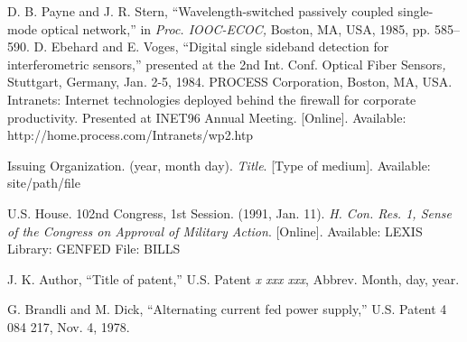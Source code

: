 \documentclass{IEEEtaes}
\begin{document}
\vspace*{-12pt}
\begin{thebibliography}{[31d]}
\setcounter{enumiv}{13}
D. B. Payne and J. R. Stern, ``Wavelength-switched passively coupled single-mode optical network,'' in \emph{Proc. IOOC-ECOC,} Boston, MA, USA, 1985, pp. 585--590.
D. Ebehard and E. Voges, ``Digital single sideband detection for interferometric sensors,'' presented at the 2nd Int. Conf. Optical Fiber Sensors\emph{,} Stuttgart, Germany, Jan. 2-5, 1984.
PROCESS Corporation, Boston, MA, USA. Intranets: Internet technologies deployed behind the firewall for corporate productivity. Presented at INET96 Annual Meeting. {[}Online{]}. Available: http://home.process.com/Intranets/wp2.htp
\end{thebibliography}

\vspace*{-12pt}
\begin{thebibliography}{[31d]}
\item[] Issuing Organization. (year, month day). \emph{Title}. {[}Type of medium{]}. Available: site/path/file
\end{thebibliography}

\vspace*{-12pt}
\begin{thebibliography}{[31d]}
\setcounter{enumiv}{16}
U.S. House. 102nd Congress, 1st Session. (1991, Jan. 11). \emph{H. Con. Res. 1, Sense of the Congress on Approval of Military Action}. {[}Online{]}. Available: LEXIS Library: GENFED File: BILLS
\end{thebibliography}

\vspace*{-12pt}
\begin{thebibliography}{[31d]}
\item[] J. K. Author, ``Title of patent,'' U.S. Patent \emph{x xxx xxx}, Abbrev. Month, day, year.
\end{thebibliography}

\vspace*{-12pt}
\begin{thebibliography}{[31d]}
\setcounter{enumiv}{17}
   G. Brandli and M. Dick, ``Alternating current fed power supply,'' U.S. Patent 4 084 217, Nov. 4, 1978.
\end{thebibliography}
\end{document}
